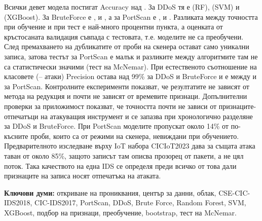 Всички девет модела постигат Accuracy над . За DDoS тя е  (RF),  (SVM) и  (XGBoost). За BruteForce е ,  и , а за PortScan е ,  и . Разликата между точността при обучение и при тест е най-много  процентни пункта, а оценката от кръстосаната валидация съвпада с тестовата, т.е. моделите не са преобучени. След премахването на дубликатите от  проби на скенера остават само  уникални записа, затова тестът за PortScan е малък и разликите между алгоритмите там не са статистически значими (тест на McNemar). При естественото съотношение на класовете (-- атаки) Precision остава над 99\% за DDoS и BruteForce и е между  и  за PortScan. Контролните експерименти показват, че резултатите не зависят от метода на редукция и почти не зависят от времевите признаци. Допълнителни проверки за приложимост показват, че точността почти не зависи от признаците-отпечатъци на атакуващия инструмент и се запазва при хронологично разделяне за DDoS и BruteForce. При PortScan моделите пропускат около 14\% от по-късните проби, които са от режими на скенера, невиждани при обучението. Предварителното изследване върху IoT набора CICIoT2023 дава за същата атака таван от около 85\%, защото записът там описва прозорец от пакети, а не цял поток. Така качеството на една IDS се определя преди всичко от това дали признаците на записа носят отпечатъка на атаката.

\medskip
\noindent\textsf{\textbf{\color{navy}Ключови думи:}} откриване на прониквания, център за данни, облак, CSE-CIC-IDS2018, CIC-IDS2017, PortScan, DDoS, Brute Force, Random Forest, SVM, XGBoost, подбор на признаци, преобучение, bootstrap, тест на McNemar.
